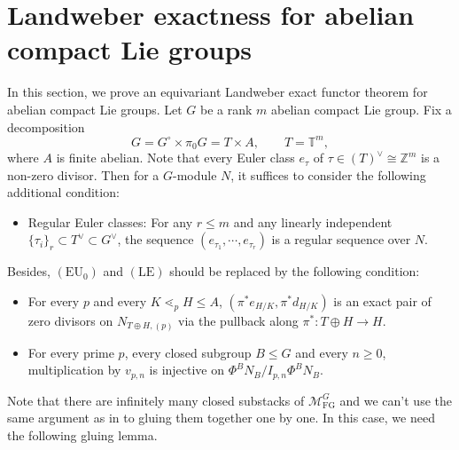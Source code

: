 \documentclass[11pt,reqno]{amsart}
\newcommand{\MFG}{\mathcal M_{\mathrm{FG}}}
\newcommand{\bbZ}{\mathbb Z}
\begin{document}
\section{Landweber exactness for abelian compact Lie groups}\label{sec:compact}
In this section, we prove an equivariant Landweber exact functor theorem for abelian compact Lie groups. Let $G$ be a rank $m$ abelian compact Lie group. Fix a decomposition
\[
G=G^\circ \times \pi_0G = T\times A,\qquad T=\mathbb T^m,
\]
where $A$ is finite abelian. Note that every Euler class $e_\tau$ of $\tau\in (T)^\vee\cong \bbZ^m$ is a non-zero divisor. Then for a $G$-module $N$, it suffices to consider the following additional condition:
\begin{itemize}[leftmargin=4em]
  \item[$(\mathrm{RE})$] Regular Euler classes: For any $r\leq m$ and any linearly independent $\{\tau_i\}_r \subset T^\vee \subset G^\vee$, the sequence $(e_{\tau_1},\cdots, e_{\tau_r})$ is a regular sequence over $N$.
\end{itemize}
Besides, $(\mathrm{EU}_0)$ and $(\mathrm{LE})$ should be replaced by the following condition:
\begin{itemize}[leftmargin=4em]
  \item[$(\mathrm{EU})$] For every $p$ and every $K\lessdot_p H\leq A$, $(\pi^* e_{H/K},\pi^* d_{H/K})$ is an exact pair of zero divisors on $N_{T\oplus H,(p)}$ via the pullback along $\pi^*\colon T\oplus H \to H$.
  \item[$\mathrm{(LE)}$] For every prime $p$, every closed subgroup $B\leq G$ and every $n\geq0$, multiplication by $v_{p,n}$ is injective on $\Phi^B N_B/I_{p,n}\Phi^B N_B$.
\end{itemize}
Note that there are infinitely many closed substacks of $\MFG^G$ and we can't use the same argument as in  to gluing them together one by one. In this case, we need the following gluing lemma.
\end{document}
